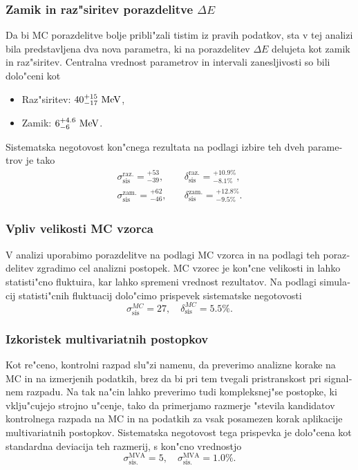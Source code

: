 \begin{otherlanguage}{slovene}
\subsubsection{Zamik in raz"siritev porazdelitve $\Delta E$}

Da bi MC porazdelitve bolje pribli"zali tistim iz pravih podatkov, sta v tej analizi bila predstavljena dva nova parametra, ki na porazdelitev $\Delta E$ delujeta kot zamik in raz"siritev. Centralna vrednost parametrov in intervali zanesljivosti so bili dolo"ceni kot
\begin{itemize}
	\item Raz"siritev: $40_{-17}^{+15}\mathrm{~MeV}$,
	\item Zamik: $6_{-6}^{+4.6}\mathrm{~MeV}$.
\end{itemize}
Sistematska negotovost kon"cnega rezultata na podlagi izbire teh dveh parametrov je tako
\begin{align}
\sigma_{\mathrm{sis}}^{\mathrm{raz.}} = {}^{+53}_{-39},&\quad \delta_{\mathrm{sis}}^{\mathrm{raz.}} = {}^{+10.9\%}_{-8.1\%}, \\
\sigma_{\mathrm{sis}}^{\mathrm{zam.}} = {}^{+62}_{-46},&\quad \delta_{\mathrm{sis}}^{\mathrm{zam.}} = {}^{+12.8\%}_{-9.5\%}.
\end{align}

\subsubsection{Vpliv velikosti MC vzorca}
V analizi uporabimo porazdelitve na podlagi MC vzorca in na podlagi teh porazdelitev zgradimo cel analizni postopek. MC vzorec je kon"cne velikosti in lahko statisti"cno fluktuira, kar lahko spremeni vrednost rezultatov. Na podlagi simulacij statisti"cnih fluktuacij dolo"cimo prispevek sistematske negotovosti
\begin{equation}
\sigma_{\mathrm{sis}}^{MC} = 27,\quad \delta_{\mathrm{sis}}^{MC} = 5.5\%.
\end{equation}


\subsubsection{Izkoristek multivariatnih postopkov}
Kot re"ceno, kontrolni razpad slu"zi namenu, da preverimo analizne korake na MC in na izmerjenih podatkih, brez da bi pri tem tvegali pristranskost pri signalnem razpadu. Na tak na"cin lahko preverimo tudi kompleksnej"se postopke, ki vklju"cujejo strojno u"cenje, tako da primerjamo razmerje "stevila kandidatov kontrolnega razpada na MC in na podatkih za vsak posamezen korak aplikacije multivariatnih postopkov. Sistematska negotovost tega prispevka je dolo"cena kot standardna deviacija teh razmerij, s kon"cno vrednostjo
\begin{equation}
\sigma_{\mathrm{sis.}}^{\mathrm{MVA}} = 5,\quad\sigma_{\mathrm{sis.}}^{\mathrm{MVA}} = 1.0\%.
\end{equation}


\end{otherlanguage}
